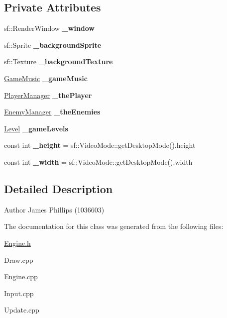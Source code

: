 \subsection*{Private Attributes}
\begin{DoxyCompactItemize}
\item 
\mbox{\label{class_engine_afd93e6a52301e792650f99043f113cbf}} 
sf\+::\+Render\+Window {\bfseries \+\_\+window}
\item 
\mbox{\label{class_engine_a1d2219c1a87bf21a3d2bc380624aad5d}} 
sf\+::\+Sprite {\bfseries \+\_\+background\+Sprite}
\item 
\mbox{\label{class_engine_aeb8f54a010a6f1442872692ce869166a}} 
sf\+::\+Texture {\bfseries \+\_\+background\+Texture}
\item 
\mbox{\label{class_engine_a65c78abdcfa8ae0c4dbe04985b09eac7}} 
\hyperlink{class_game_music}{Game\+Music} {\bfseries \+\_\+game\+Music}
\item 
\mbox{\label{class_engine_ad9c98c3f60277c95d34d48e02082c47c}} 
\hyperlink{class_player_manager}{Player\+Manager} {\bfseries \+\_\+the\+Player}
\item 
\mbox{\label{class_engine_af5dd5d02b414b2a098988c371b00ac88}} 
\hyperlink{class_enemy_manager}{Enemy\+Manager} {\bfseries \+\_\+the\+Enemies}
\item 
\mbox{\label{class_engine_aef39034128dc92b64d76435742ca6851}} 
\hyperlink{class_level}{Level} {\bfseries \+\_\+game\+Levels}
\item 
\mbox{\label{class_engine_a75beb6a1c14b936fa666bb2de726dc12}} 
const int {\bfseries \+\_\+height} = sf\+::\+Video\+Mode\+::get\+Desktop\+Mode().height
\item 
\mbox{\label{class_engine_a535dc0c572ec7af354a4b15f20bb02df}} 
const int {\bfseries \+\_\+width} = sf\+::\+Video\+Mode\+::get\+Desktop\+Mode().width
\end{DoxyCompactItemize}


\subsection{Detailed Description}
\begin{DoxyAuthor}{Author}
James Phillips (1036603) 
\end{DoxyAuthor}


The documentation for this class was generated from the following files\+:\begin{DoxyCompactItemize}
\item 
\hyperlink{_engine_8h}{Engine.\+h}\item 
Draw.\+cpp\item 
Engine.\+cpp\item 
Input.\+cpp\item 
Update.\+cpp\end{DoxyCompactItemize}
